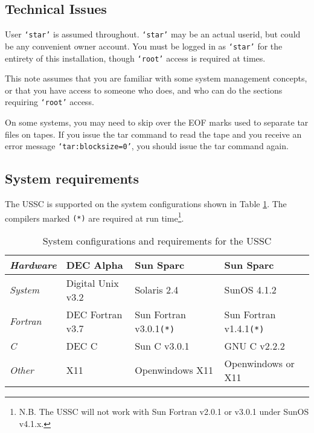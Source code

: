\subsection{Technical Issues}
\label{s:intro:techi}

User {\tt {\tt `star'}} is assumed throughout. {\tt `star'} may be an
actual userid, but could be any convenient owner account.  You must be
logged in as {\tt `star'} for the entirety of this installation, though
{\tt `root'} access is required at times.

This note assumes that you are familiar with some system management concepts,
or that you have access to someone who does, and who can do the sections
requiring {\tt `root'} access.

On some systems, you may need to skip over the EOF marks used to separate
tar files on tapes.  If you issue the tar command to read the tape and
you receive an error message {\tt `tar:blocksize=0'}, you should issue
the tar command again.

\subsection{System requirements}
\label{s:intro:reqs}

The USSC is supported on the system configurations shown in Table
\ref{t:reqs}. The compilers marked {\tt (*)} are required at run
time\footnote{N.B. The USSC will not work with Sun Fortran
v2.0.1 or v3.0.1 under SunOS v4.1.x.}.

\begin{table}[h]
\begin{small}
\begin{center}
\begin{tabular}{|l||l||l||l|} \hline
{\em Hardware} & DEC Alpha         & Sun Sparc & Sun Sparc \\ \hline
{\em System}   & Digital Unix v3.2 & Solaris 2.4 & SunOS 4.1.2 \\ \hline
{\em Fortran}  & DEC Fortran v3.7  & Sun Fortran v3.0.1{\tt (*)} &
                 Sun Fortran v1.4.1{\tt (*)} \\ \hline
{\em C}        & DEC C             & Sun C v3.0.1 & GNU C v2.2.2 \\ \hline
{\em Other}    & X11 & Openwindows X11 & Openwindows or X11 \\ \hline
\end{tabular}
\caption{System configurations and requirements for the USSC}
\label{t:reqs}
\end{center}
\end{small}
\end{table}

